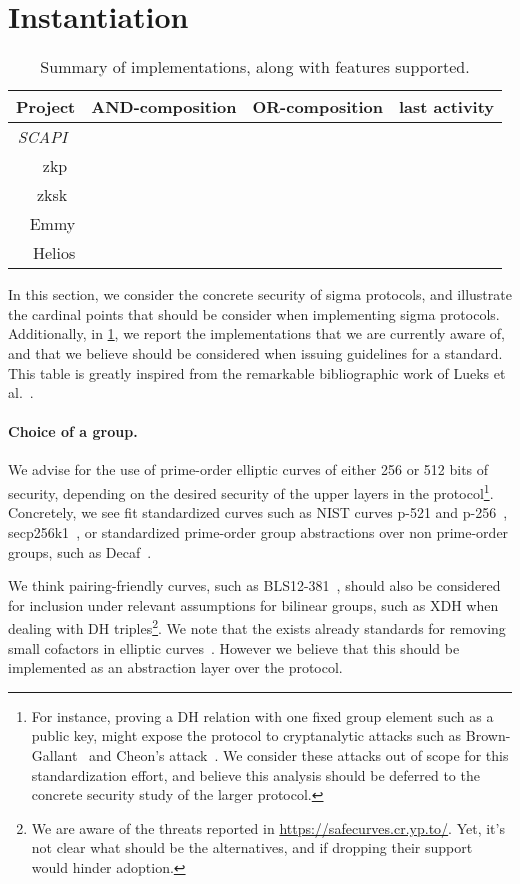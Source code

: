 \documentclass[runningheads]{llncs}
\begin{document}
\section{Instantiation }

\begin{table}[t]
  \caption{Summary of implementations, along with features supported.
  \label{table:implementations}}
  \centering
\begin{tabular}{rccc}
  Project & AND-composition & OR-composition & last activity \\
  \hline
  \emph{SCAPI}~\cite{scapi}\\
  zkp~\cite{zkp}\\
  zksk~\cite{zksk}\\
  Emmy\\
  Helios \\
  \hline
\end{tabular}
\end{table}

In this section, we consider the concrete security of sigma protocols, and illustrate the cardinal points that should be consider when implementing sigma protocols.
Additionally, in \cref{table:implementations}, we report the implementations that we are currently aware of, and that we believe should be considered when issuing guidelines for a standard.
This table is greatly inspired from the remarkable bibliographic work of Lueks et al.~\cite{zksk}.
\paragraph{Choice of a group.} We advise for the use of prime-order elliptic curves of either 256 or 512 bits of security, depending on the desired security of the upper layers in the protocol\footnote{For instance, proving a DH relation with one fixed group element such as a public key, might expose the protocol to cryptanalytic attacks such as Brown-Gallant~\cite{EPRINT:BroGal04} and Cheon’s attack~\cite{EC:Cheon06}. We consider these attacks out of scope for this standardization effort, and believe this analysis should be deferred to the concrete security study of the larger protocol.}.
Concretely, we see fit standardized curves such as NIST curves p-521 and p-256~\cite{fips2}, secp256k1~\cite{SECG}, or standardized prime-order group abstractions over non prime-order groups, such as Decaf~\cite{cfrg-ristretto-decaf}.

We think pairing-friendly curves, such as BLS12-381~\cite{bls12}, should also be considered for inclusion under relevant assumptions for bilinear groups, such as XDH when dealing with DH triples\footnote{We are aware of the threats reported in
\url{https://safecurves.cr.yp.to/}.
Yet, it's not clear what should be the alternatives, and if dropping their support would hinder adoption.
}.
We note that the exists already standards for removing small cofactors in elliptic curves~\cite{rfc2785}.
 However we believe that this should be implemented as an abstraction layer over the protocol.
\end{document}
